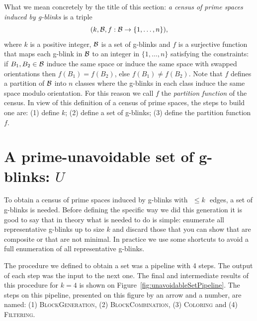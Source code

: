 \newpage

What we mean concretely by the title of this section:
{\it a census of prime spaces induced by
g-blinks} is a triple \vspace{-0.3cm}$$(k,{\cal B},f:{\cal B}
\rightarrow \{1, \ldots, n\}),\vspace{-0.3cm}$$ where $k$ is a
positive integer, ${\cal B}$ is a \kpu set of g-blinks and $f$ is a
surjective function that maps each g-blink in ${\cal B}$ to an integer
in $\{1, \ldots, n\}$ satisfying the constraints: if $B_1,B_2 \in
{\cal B}$ induce the same space or induce the same space with
swapped orientations then $f(B_1) = f(B_2)$, else
$f(B_1) \neq f(B_2)$. Note that $f$ defines a partition of ${\cal B}$
into $n$ classes where the g-blinks in each class induce the same space
modulo orientation. For this reason we call $f$ the
{\it partition function} of the census. In view of this definition of a
census of prime spaces, the steps to build one are: (1) define $k$;
(2) define a \kpu set of g-blinks; (3) define the partition function $f$.

\newpage
\section{A prime-unavoidable set of g-blinks: $U$}

To obtain a census of prime spaces induced by g-blinks with $\,\,\leq
k \,\,$ edges, a set of \kpu g-blinks is needed. Before defining the
specific way we did this generation it is good to say that in theory
what is needed to do is simple: enumerate all representative g-blinks up to size
$k$ and discard those that you can show that are composite or that are
not minimal. In practice we use some shortcuts to avoid a full
enumeration of all representative g-blinks.

The procedure we defined to obtain a \kpu set was a pipeline with 4
steps. The output of each step was the input to the next one. The
final and intermediate results of this procedure for $k=4$ is shown
on Figure~\ref{fig:unavoidableSetPipeline}. The steps on this pipeline,
presented on this figure by an arrow and a number, are named:
(1) \textsc{BlockGeneration}, (2) \textsc{BlockCombination}, (3) \textsc{Coloring}
and (4) \textsc{Filtering}.

